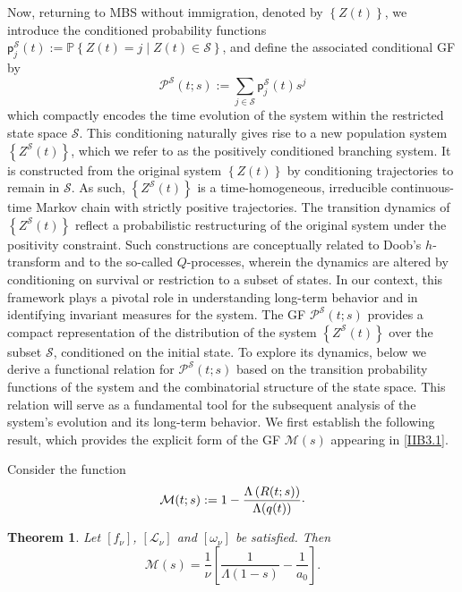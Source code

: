 \documentclass[10pt,reqno]{amsart}
\newtheorem{theorem}{Theorem}
\theoremstyle{definition}
\numberwithin{equation}{section}
\begin{document}
    Now, returning to MBS without immigration, denoted by $\left\{Z(t)\right\}$, we introduce the conditioned
    probability functions $\textsf{p}_j^{\mathcal{S}}(t):=\mathbb{P}\left\{Z(t)=j\mid{Z(t)}\in\mathcal{S}\right\}$,
    and define the associated conditional GF by
\[
    {{\mathcal{P}}^{\mathcal{S}}}(t;s):=\sum\limits_{j\in \mathcal{S}}{\textsf{p}_{j}^{\mathcal{S}}(t){{s}^{j}}}
\]
    which  compactly encodes the time evolution of the system within the restricted state space $\mathcal{S}$.
    This conditioning naturally gives rise to a new population system $\left\{{{Z}^{\mathcal{S}}}(t)\right\}$,
    which we refer to as the positively conditioned branching system. It is constructed from the original
    system  $\left\{Z(t)\right\}$ by conditioning trajectories to remain in $\mathcal{S}$. As such,
    $\left\{{{Z}^{\mathcal{S}}}(t)\right\}$ is a time-homogeneous, irreducible continuous-time Markov chain with
    strictly positive trajectories. The transition dynamics of $\left\{{{Z}^{\mathcal{S}}}(t)\right\}$ reflect
    a probabilistic restructuring of the original system under the positivity constraint. Such constructions are
    conceptually related to Doob's $h$-transform and to the so-called $Q$-processes, wherein the dynamics are
    altered by conditioning on survival or restriction to a subset of states. In our context, this framework
    plays a pivotal role in understanding long-term behavior and in identifying invariant measures for the
    system. The GF ${{\mathcal{P}}^{\mathcal{S}}}(t;s)$ provides a compact representation of the distribution
    of the system $\left\{{{Z}^{\mathcal{S}}}(t)\right\}$ over the subset $\mathcal{S}$, conditioned on the
    initial state. To explore its dynamics, below we derive a functional relation for
    ${{\mathcal{P}}^{\mathcal{S}}}(t;s)$ based on the transition probability functions of the system and
    the combinatorial structure of the state space. This relation will serve as a fundamental tool for the
    subsequent analysis of the system's evolution and its long-term behavior. We first establish the
    following result, which provides the explicit form of the GF $\mathcal{M}(s)$ appearing in {\eqref{IIB3.1}}.

    Consider the function
\begin{equation}                \label{IIB4.28}
    \mathcal{M}(t;s):=1-\frac{\Lambda\left(R(t;s)\right)}{\Lambda(q(t))} {\raise1.5pt\hbox{.}}
\end{equation}

\begin{theorem}                      \label{IIBTh7}
    Let $[{f}_{\nu}]$, $[{\mathcal{L}}_{\nu}]$ and $[{\omega}_{\nu}]$ be satisfied. Then
\begin{equation}                \label{IIB4.29}
    \mathcal{M}(s)=\frac{1}{\nu }\left[ \frac{1}{\Lambda (1-s)}-\frac{1}{{{a}_{0}}} \right].
\end{equation}
\end{theorem}
\end{document}
